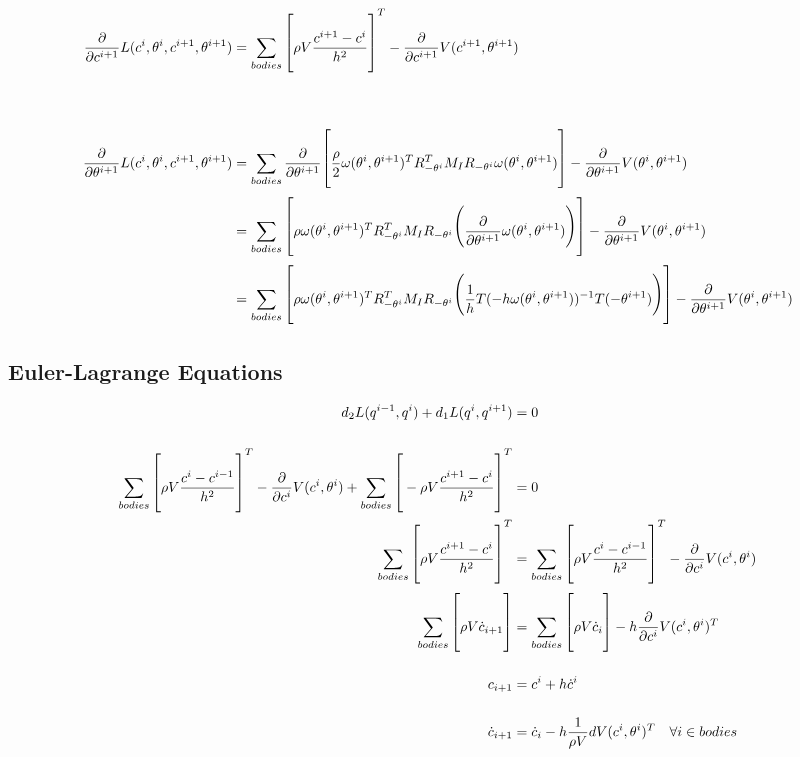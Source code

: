 \documentclass[landscape]{article}
\theoremstyle{definition}
\begin{document}
\begin{align*}
    \frac{\partial}{\partial c^{i+1}} L(c^i, \theta^i, c^{i+1}, \theta^{i+1})
        &= \Huge\sum_{bodies} \Big[ \rho V \frac{c^{i+1} - c^i}{h^2} \Big]^T - \frac{\partial}{\partial c^{i+1}} V(c^{i+1}, \theta^{i+1}) \\ \\
    \frac{\partial}{\partial \theta^{i+1}} L(c^i, \theta^i, c^{i+1}, \theta^{i+1}) 
        &= \Huge\sum_{bodies} \frac{\partial}{\partial \theta^{i+1}} \Big[ \frac{\rho}{2} \omega(\theta^i, \theta^{i+1})^T R_{-\theta^i}^T M_I R_{-\theta^i} \omega(\theta^i, \theta^{i+1}) \Big] - \frac{\partial}{\partial \theta^{i+1}} V(\theta^i, \theta^{i+1}) \\
        &= \Huge\sum_{bodies}  \Big[ \rho \omega(\theta^i, \theta^{i+1})^T R_{-\theta^i}^T M_I R_{-\theta^i} \big( \frac{\partial}{\partial \theta^{i+1}} \omega(\theta^i, \theta^{i+1}) \big) \Big] - \frac{\partial}{\partial \theta^{i+1}} V(\theta^i, \theta^{i+1}) \\
        &= \Huge\sum_{bodies}  \Big[ \rho \omega(\theta^i, \theta^{i+1})^T R_{-\theta^i}^T M_I R_{-\theta^i} \big( \frac{1}{h} T(-h\omega(\theta^i, \theta^{i+1}))^{-1} T(-\theta^{i+1}) \big) \Big] - \frac{\partial}{\partial \theta^{i+1}} V(\theta^i, \theta^{i+1}) \\
\end{align*}

\pagebreak
\subsection{Euler-Lagrange Equations}

\begin{align*}
    d_2 L(q^{i-1}, q^i) + d_1 L(q^i, q^{i+1}) &= 0 \\ \\
    \Huge\sum_{bodies} \Big[ \rho V \frac{c^i - c^{i-1}}{h^2} \Big]^T - \frac{\partial}{\partial c^i} V(c^i, \theta^i) + \Huge\sum_{bodies} \Big[ -\rho V \frac{c^{i+1} - c^i}{h^2} \Big]^T &= 0 \\
     \Huge\sum_{bodies} \Big[ \rho V \frac{c^{i+1} - c^i}{h^2} \Big]^T &= \Huge\sum_{bodies} \Big[ \rho V \frac{c^i - c^{i-1}}{h^2} \Big]^T - \frac{\partial}{\partial c^i} V(c^i, \theta^i) \\
    \Huge\sum_{bodies} \Big[ \rho V \dot{c}_{i+1} \Big] &= \Huge\sum_{bodies} \Big[ \rho V \dot{c}_i \Big] - h \frac{\partial}{\partial c^i} V(c^i, \theta^i)^T \\
    c_{i+1} &= c^i + h \dot{c}^i \\
    \dot{c}_{i+1} &= \dot{c}_i - h \frac{1}{\rho V} dV(c^i, \theta^i)^T \quad \forall i \in bodies
\end{align*}
    
\end{document}
